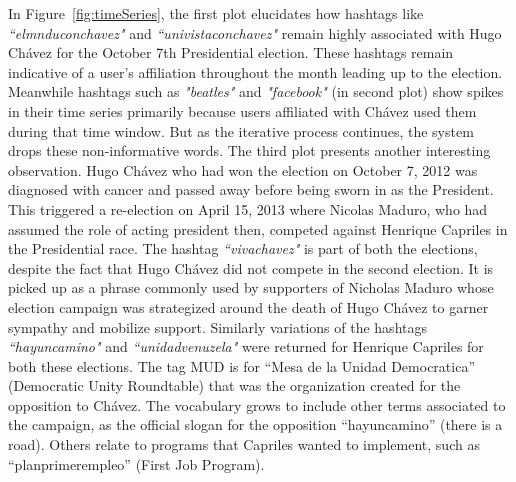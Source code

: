 In Figure~\ref{fig:timeSeries}, the first plot elucidates how hashtags like \emph{``elmnduconchavez"} and 
\emph{``univistaconchavez"} remain highly associated with Hugo Ch\'{a}vez for the October 7th Presidential election. 
These hashtags remain indicative of a user's affiliation throughout the month leading up to the election.
Meanwhile hashtags such as \emph{"beatles"} and \emph{"facebook"} (in second plot) show spikes in their time series primarily because users affiliated with Ch\'{a}vez used them during that time window. 
But as the iterative process continues, the system drops these non-informative words.
The third plot presents another interesting observation.
Hugo Ch\'{a}vez who had won the election on October 7, 2012 was diagnosed with cancer and passed away
before being sworn in as the President.
This triggered a re-election on April 15, 2013 where Nicolas Maduro, who had assumed the role of acting president then, competed 
against Henrique Capriles in the Presidential race.
The hashtag \emph{``vivachavez"} is part of both the elections, despite the 
fact that Hugo Ch\'{a}vez did not compete in the second election.
It is picked up as a phrase commonly used by supporters of Nicholas Maduro whose election campaign was strategized around the death of Hugo Ch\'{a}vez to garner sympathy and mobilize support.
Similarly variations of the hashtags \emph{``hayuncamino"} and \emph{``unidadvenuzela"} were returned 
for Henrique Capriles for both these elections.
The tag MUD is for ``Mesa de la Unidad Democratica” (Democratic Unity Roundtable) that was the organization created for the opposition to Ch\'{a}vez. 
The vocabulary grows to include other terms associated to the campaign, as the official slogan for the opposition ``hayuncamino” (there is a road). 
Others relate to programs that Capriles wanted to implement, such as ``planprimerempleo” (First Job Program). 

